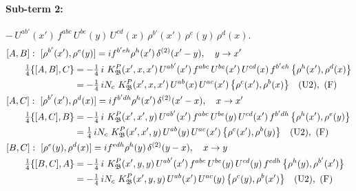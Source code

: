 \documentclass[10pt]{article}
\numberwithin{equation}{section}
\begin{document}
\paragraph{Sub-term 2:} $-\,U^{ab'}(x')\,f^{abc}\,U^{be}(y)\,U^{cd}(x)\,\rho^{b'}(x')\,\rho^{e}(y)\,\rho^{d}(x)$.
\begin{align}
&[A,B]:\ [\rho^{b'}(x'),\rho^{e}(y)]=i f^{b'eh}\rho^{h}(x')\,\delta^{(2)}(x'-y),\quad y\to x'\notag\\
&\qquad \tfrac14\{[A,B],C\}=-\tfrac14\,i\,\,K^{P}_{\mathfrak B}(x',x,x')\,U^{ab'}(x')\,f^{abc}\,U^{be}(x')\,U^{cd}(x)\,f^{b'eh}\,\big\{\rho^{h}(x'),\rho^{d}(x)\big\}\notag\\
&\qquad\phantom{\tfrac14\{[A,B],C\}}=-\tfrac14\,i N_{c}\,\,K^{P}_{\mathfrak B}(x',x,x')\,U^{ab}(x)\,U^{ac}(x')\,\big\{\rho^{c}(x'),\rho^{b}(x)\big\}\quad\text{(U2)},\ \text{(F)}
\label{eq:GI.IV.P-2-AB}\\
&[A,C]:\ [\rho^{b'}(x'),\rho^{d}(x)]=i f^{b'dh}\rho^{h}(x')\,\delta^{(2)}(x'-x),\quad x\to x'\notag\\
&\qquad \tfrac14\{[A,C],B\}=-\tfrac14\,i\,\,K^{P}_{\mathfrak B}(x',x',y)\,U^{ab'}(x')\,f^{abc}\,U^{be}(y)\,U^{cd}(x')\,f^{b'dh}\,\big\{\rho^{h}(x'),\rho^{e}(y)\big\}\notag\\
&\qquad\phantom{\tfrac14\{[A,C],B\}}=\tfrac14\,i N_{c}\,\,K^{P}_{\mathfrak B}(x',x',y)\,U^{ab}(y)\,U^{ac}(x')\,\big\{\rho^{c}(x'),\rho^{b}(y)\big\}\quad\text{(U2)},\ \text{(F)}
\label{eq:GI.IV.P-2-AC}\\
&[B,C]:\ [\rho^{e}(y),\rho^{d}(x)]=i f^{edh}\rho^{h}(y)\,\delta^{(2)}(y-x),\quad x\to y\notag\\
&\qquad \tfrac14\{[B,C],A\}=-\tfrac14\,i\,\,K^{P}_{\mathfrak B}(x',y,y)\,U^{ab'}(x')\,f^{abc}\,U^{be}(y)\,U^{cd}(y)\,f^{edh}\,\big\{\rho^{h}(y),\rho^{b'}(x')\big\}\notag\\
&\qquad\phantom{\tfrac14\{[B,C],A\}}=-\tfrac14\,i N_{c}\,\,K^{P}_{\mathfrak B}(x',y,y)\,U^{ab}(x')\,U^{ac}(y)\,\big\{\rho^{c}(y),\rho^{b}(x')\big\}\quad\text{(U2)},\ \text{(F)}
\label{eq:GI.IV.P-2-BC}
\end{align}
\end{document}
